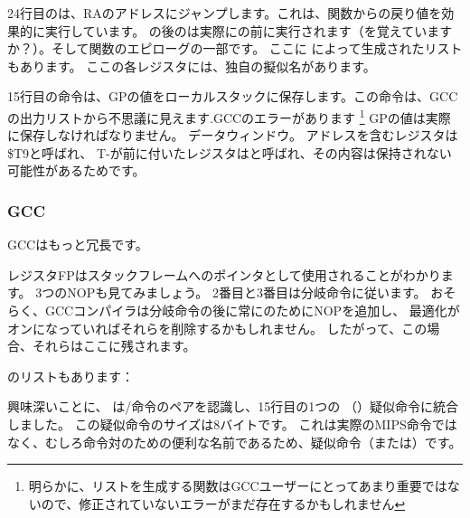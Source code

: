
24行目のは、\ac{RA}のアドレスにジャンプします。これは、関数からの戻り値を効果的に実行しています。 
の後のは実際にの前に実行されます（を覚えていますか？）。そして関数のエピローグの一部です。 
ここに \IDA によって生成されたリストもあります。 ここの各レジスタには、独自の擬似名があります。



15行目の命令は、GPの値をローカルスタックに保存します。この命令は、GCCの出力リストから不思議に見えます.GCCのエラーがあります
\footnote{明らかに、リストを生成する関数はGCCユーザーにとってあまり重要ではないので、修正されていないエラーがまだ存在するかもしれません}
GPの値は実際に保存しなければなりません。 データウィンドウ。 \puts アドレスを含むレジスタは\$T9と呼ばれ、
T-が前に付いたレジスタはと呼ばれ、その内容は保持されない可能性があるためです。

\subsubsection{\NonOptimizing GCC}

\NonOptimizing GCCはもっと冗長です。



レジスタFPはスタックフレームへのポインタとして使用されることがわかります。 
3つの\ac{NOP}も見てみましょう。 
2番目と3番目は分岐命令に従います。 
おそらく、GCCコンパイラは分岐命令の後に常にのために\ac{NOP}を追加し、
最適化がオンになっていればそれらを削除するかもしれません。 
したがって、この場合、それらはここに残されます。

\IDA のリストもあります：




興味深いことに、 \IDA は/命令のペアを認識し、15行目の1つの
（）疑似命令に統合しました。
この疑似命令のサイズは8バイトです。 
これは実際のMIPS命令ではなく、むしろ命令対のための便利な名前であるため、疑似命令（または）です。

